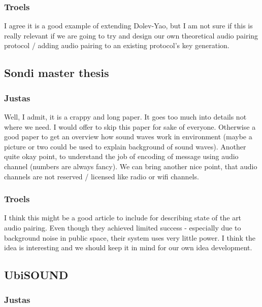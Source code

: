 \documentclass[12pt]{article}
\begin{document}
\subsubsection{Troels}
\label{subs:Troels}

I agree it is a good example of extending Dolev-Yao, but I am not sure if this is really relevant if we are going to try and design our own theoretical audio pairing protocol / adding audio pairing to an existing protocol's key generation.

\subsection{Sondi master thesis}
\label{sub:Sondi master thesis}

\subsubsection{Justas}
\label{subs:Justas}

Well, I admit, it is a crappy and long paper. It goes too much into details not where we need. I would offer to skip this paper for sake of everyone.
Otherwise a good paper to get an overview how sound waves work in environment (maybe a picture or two could be used to explain background of sound waves).
Another quite okay point, to understand the job of encoding of message using audio channel (numbers are always fancy).
We can bring another nice point, that audio channels are not reserved / licensed like radio or wifi channels.

\subsubsection{Troels}
\label{subs:Troels}

I think this might be a good article to include for describing state of the art audio pairing. Even though they achieved limited success - especially due to background noise in public space, their system uses very little power. I think the idea is interesting and we should keep it in mind for our own idea development.

\subsection{UbiSOUND}
\label{sub:UbiSOUND}

\subsubsection{Justas}
\label{subs:Justas}
\end{document}

